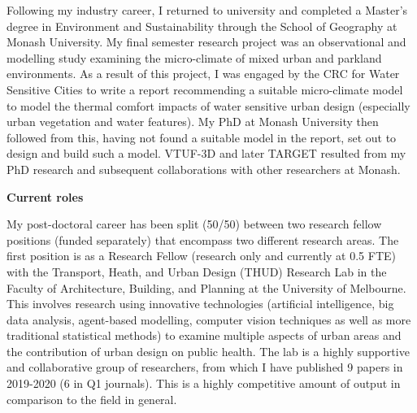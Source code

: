 Following my industry career, I returned to university and completed a Master's degree in Environment and Sustainability through the School of Geography at Monash University. My final semester research project was an observational and modelling study examining the micro-climate of mixed urban and parkland environments. As a result of this project, I was engaged by the CRC for Water Sensitive Cities to write a report recommending a suitable micro-climate model to model the thermal comfort impacts of water sensitive urban design (especially urban vegetation and water features). My PhD at Monash University then followed from this, having not found a suitable model in the report, set out to design and build such a model. VTUF-3D and later TARGET resulted from my PhD research and subsequent collaborations with other researchers at Monash.

\textbf{Current roles}

My post-doctoral career has been split (50/50) between two research fellow positions (funded separately) that encompass two different research areas. The first position is as a Research Fellow (research only and currently at 0.5 FTE)  with the Transport, Heath, and Urban Design (THUD) Research Lab in the Faculty of Architecture, Building, and Planning at the University of Melbourne. This involves research using innovative technologies (artificial intelligence, big data analysis, agent-based modelling, computer vision techniques as well as more traditional statistical methods) to examine multiple aspects of urban areas and the contribution of urban design on public health. The lab is a highly supportive and collaborative group of researchers, from which I have published 9 papers in 2019-2020 (6 in Q1 journals). This is a highly competitive amount of output in comparison to the field in general.


